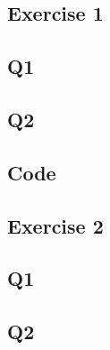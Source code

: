 \begin{appendices}
\chapter{Exercise 1}
\section{Q1}

\section{Q2}

\section{Code}
\end{appendices}

\begin{appendices}
\chapter{Exercise 2}
\section{Q1}

\section{Q2}

\end{appendices}